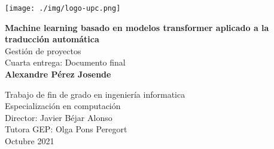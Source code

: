 \begin{titlepage}
\begin{center}

\texttt{[image: ./img/logo-upc.png]}\\[2.0cm]

\vbox{ }

{\LARGE \bfseries  Machine learning basado en modelos transformer aplicado a la traducción automática}\\[1.0cm]
{\Large Gestión de proyectos}\\[0.15cm]
{\large Cuarta entrega: Documento final}\\[3.0cm]

{\large \bfseries Alexandre Pérez Josende}
\vfill

{\normalsize Trabajo de fin de grado en ingeniería informatica}\\
{\normalsize Especialización en computación}\\[0.4cm]

{\normalsize Director: Javier Béjar Alonso}\\
{\normalsize Tutora GEP: Olga Pons Peregort}\\[0.4cm]

{\normalsize Octubre 2021}

\end{center}
\end{titlepage}